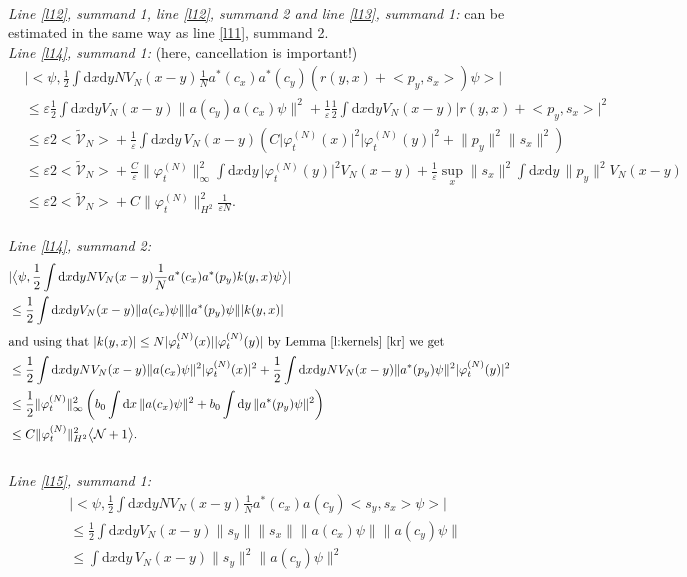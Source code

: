 \documentclass[11pt,a4paper,draft,DIV11]{scrartcl}	%
\newcommand{\di}{\textrm{d}}		%
\newcommand{\Ncal}{\mathcal{N}}		%
\newcommand{\tilV}{\tilde{\mathcal{V}}_N}		%
\newcommand{\estlist}[2]{\emph{\vspace{.3em}\\Line \ref{l#1}, summand #2:}}
\newcommand{\nestlist}[2]{line \ref{l#1}, summand #2}
\newcommand{\Nestlist}[2]{Line \ref{l#1}, summand #2}
\newcommand{\scal}[2]{\big<#1,#2\big>} %
\newcommand{\norm}[1]{\lVert#1\rVert}	%
\newcommand{\ev}[1]{\big<#1\big>}	%
\newcommand{\ph}{\varphi_t^{(N)}}	%
\newcommand{\dxyNV}{\frac{1}{2}\int \di x\di y N V_N(x-y)} %
\newcommand{\dxyV}{\frac{1}{2}\int \di x\di y V_N(x-y)} %
\begin{document}
\begin{fleqn}[0.5em]
\emph{\vspace{.3em}\\\Nestlist{12}{1}, \nestlist{12}{2} and \nestlist{13}{1}:} can be estimated in the same way as \nestlist{11}{2}.\newline
\estlist{14}{1} (here, cancellation is important!)
\begin{align*}
& \lvert \scal{\psi}{\dxyNV \frac{1}{N}a^\ast(c_x) a^\ast(c_y) \left( r(y,x)+\scal{p_y}{s_x} \right)\psi} \rvert \\
& \leq \varepsilon \dxyV \norm{a(c_y)a(c_x)\psi}^2 + \frac{1}{\varepsilon} \dxyV \lvert r(y,x)+\scal{p_y}{s_x} \rvert^2 \\
& \leq \varepsilon 2\ev{\tilV} + \frac{1}{\varepsilon} \int \di x\di y\, V_N(x-y) \left( C\lvert\ph(x)\rvert^2\lvert\ph(y)\rvert^2 +\norm{p_y}^2\norm{s_x}^2 \right) \\
& \leq \varepsilon 2\ev{\tilV} + \frac{C}{\varepsilon} \norm{\ph}_\infty^2 \int \di x \di y\, \lvert \ph(y)\rvert^2 V_N(x-y) + \frac{1}{\varepsilon} \sup_x\norm{s_x}^2 \int \di x\di y\, \norm{p_y}^2 V_N(x-y) \\
& \leq \varepsilon 2\ev{\tilV} + C\norm{\ph}_{H^2}^2 \frac{1}{\varepsilon N}.
\end{align*}
\estlist{14}{2}
\begin{align*}
& \lvert \scal{\psi}{\dxyNV \frac{1}{N} a^\ast(c_x) a^\ast(p_y) k(y,x)\psi} \rvert \\
& \leq \dxyV \norm{a(c_x)\psi} \norm{a^\ast(p_y)\psi} \lvert k(y,x)\rvert \\
\intertext{and using that $\lvert k(y,x)\rvert \leq N\lvert \ph(x)\rvert\lvert \ph(y)\rvert$ by Lemma \ref{l:kernels} \ref{kr} we get}
& \leq \dxyNV \norm{a(c_x)\psi}^2 \lvert\ph(x)\rvert^2 + \dxyNV \norm{a^\ast(p_y)\psi}^2 \lvert \ph(y)\rvert^2\\
& \leq \frac{1}{2} \norm{\ph}_\infty^2 \left( b_0 \int \di x\,\norm{a(c_x)\psi}^2 + b_0 \int \di y\,\norm{a^\ast(p_y)\psi}^2 \right) \\
& \leq C \norm{\ph}_{H^2}^2 \ev{\Ncal+1}.
\end{align*}
\estlist{15}{1}
\begin{align*}
& \lvert \scal{\psi}{\dxyNV \frac{1}{N}a^\ast(c_x)a(c_y) \scal{s_y}{s_x}\psi} \rvert \\
& \leq \dxyV \norm{s_y} \norm{s_x} \norm{a(c_x)\psi} \norm{a(c_y)\psi} \\
& \leq \int \di x \di y\, V_N(x-y) \norm{s_y}^2 \norm{a(c_y)\psi}^2 \\

\end{align*}
\end{fleqn}
\end{document}
